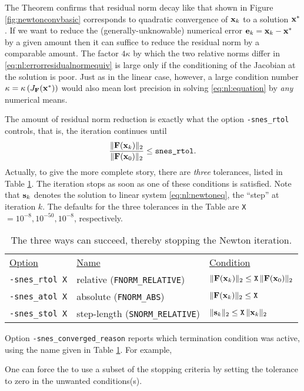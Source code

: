 The Theorem confirms that residual norm decay like that shown in Figure \ref{fig:newtonconvbasic} corresponds to quadratic convergence of $\mathbf{x}_k$ to a solution $\mathbf{x}^*$.  If we want to reduce the (generally-unknowable) numerical error $\mathbf{e}_k=\mathbf{x}_k-\mathbf{x}^*$ by a given amount then it can suffice to reduce the residual norm by a comparable amount.  The factor $4 \kappa$ by which the two relative norms differ in \eqref{eq:nl:errorresidualnormequiv} is large only if the conditioning of the Jacobian at the solution is poor.  Just as in the linear case, however, a large condition number $\kappa=\kappa\left(J_{\mathbf{F}}(\mathbf{x}^*)\right)$ would also mean lost precision in solving \eqref{eq:nl:equation} by \emph{any} numerical means.

The amount of residual norm reduction is exactly what the option \texttt{-snes\_rtol} controls, that is, the iteration continues until
    $$\frac{\|\mathbf{F}(\mathbf{x}_k)\|_2}{\|\mathbf{F}(\mathbf{x}_0)\|_2} \le \text{\texttt{snes\_rtol}}.$$
Actually, to give the more complete story, there are \emph{three} \pSNES tolerances, listed in Table \ref{tab:snestolerances}.  The iteration stops as soon as one of these conditions is satisfied.  Note that $\mathbf{s}_k$ denotes the solution to linear system \eqref{eq:nl:newtoneq}, the ``step'' at iteration $k$.  The defaults for the three tolerances in the Table are \texttt{X}$=10^{-8},10^{-50},10^{-8}$, respectively.

\medskip
\begin{table}
\begin{tabular}{lll}
\underline{Option}\hspace{0.2in} & \underline{Name}\hspace{0.2in} & \underline{Condition}\hspace{0.2in} \\
\texttt{-snes\_rtol X} & relative (\texttt{FNORM\_RELATIVE}) & $\|\mathbf{F}(\mathbf{x}_k)\|_2 \le \text{\texttt{X}}\, \|\mathbf{F}(\mathbf{x}_0)\|_2$ \\
\texttt{-snes\_atol X} & absolute (\texttt{FNORM\_ABS}) & $\|\mathbf{F}(\mathbf{x}_k)\|_2 \le \text{\texttt{X}}$ \\
\texttt{-snes\_stol X} & step-length (\texttt{SNORM\_RELATIVE}) & $\|\mathbf{s}_k\|_2 \le \text{\texttt{X}}\, \|\mathbf{x}_k\|_2$
\end{tabular}
\caption{The three ways \pSNES can succeed, thereby stopping the Newton iteration.} \label{tab:snestolerances}
\end{table}

\medskip
Option \texttt{-snes\_converged\_reason} reports which termination condition was active, using the name given in Table \ref{tab:snestolerances}.  For example,
One can force the \pSNES to use a subset of the stopping criteria by setting the tolerance to zero in the unwanted conditions(s).


